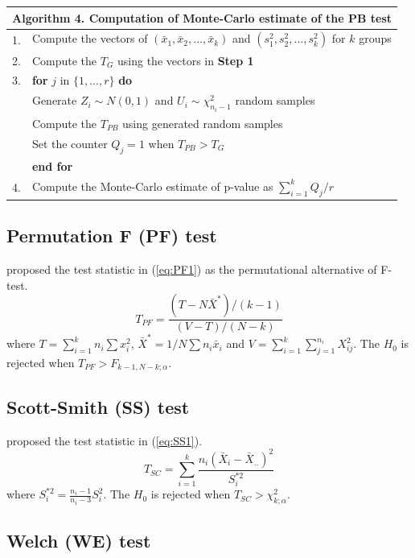 \begin{table}[h]
\centering
\begin{tabular}{ll}\midrule
\multicolumn{2}{l}{\textbf{Algorithm 4.} Computation of Monte-Carlo estimate of the PB test}\\\midrule
1.&Compute the vectors of $(\bar{x}_1, \bar{x}_2, ..., \bar{x}_k)$ and $(s_1^2, s_2^2, ..., s_k^2)$ for $k$ groups\\
2.&Compute the $T_G$ using the vectors in \textbf{Step 1}\\
3.&\textbf{for} $j$ in $\{1, ..., r\}$ \textbf{do}\\
   &Generate $Z_i \sim N(0, 1)$ and $U_i \sim \chi^2_{n_i-1}$ random samples\\
   &Compute the $T_{PB}$ using generated random samples\\
   &Set the counter $Q_j=1$ when $T_{PB}>T_G$\\
   &\textbf{end for}\\
4.&Compute the Monte-Carlo estimate of p-value as $\sum_{i=1}^k Q_j/r$\\\midrule
\end{tabular}
\end{table}
\subsection{Permutation F (PF) test}

\cite{berry:2002} proposed the test statistic in (\ref{eq:PF1}) as the permutational alternative of F-test. 
\begin{equation}
T_{PF}=\frac{(T-N\bar{X}^*)/(k-1)}{(V-T)/(N-k)} \label{eq:PF1}
\end{equation}
where $T=\sum_{i=1}^k n_i\sum{x}_i^2$, $\bar{X}^*=1/N\sum{n_i\bar{x}_i}$ and $V=\sum_{i=1}^k \sum_{j=1}^{n_i} X_{ij}^2$. The $H_0$ is rejected when $T_{PF}>F_{k-1, N-k; \alpha}$.
\subsection{Scott-Smith (SS) test}

\cite{scott:1971} proposed the test statistic in (\ref{eq:SS1}).
\begin{equation}
T_{SC}=\sum_{i=1}^k \frac{n_i(\bar{X}_i-\bar{X}_{..})^2}{S_i^{*2}} \label{eq:SS1}
\end{equation}
where $S_i^{*2}=\frac{n_i-1}{n_i-3}S_i^2$. The $H_0$ is rejected when $T_{SC}>\chi^2_{k; \alpha}$.
\subsection{Welch (WE) test}

